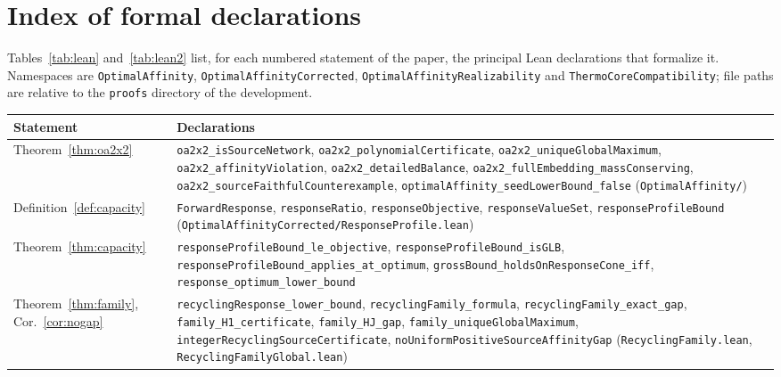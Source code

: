\documentclass[11pt,reqno]{amsart}
\theoremstyle{plain}
\theoremstyle{definition}
\theoremstyle{remark}
\numberwithin{equation}{section}
\begin{document}
\appendix
\section{Index of formal declarations}\label{app:lean}

Tables~\ref{tab:lean} and~\ref{tab:lean2} list, for each numbered statement of the paper, the principal Lean declarations that formalize it.  Namespaces are \texttt{OptimalAffinity}, \texttt{OptimalAffinityCorrected}, \texttt{OptimalAffinity\allowbreak Realizability} and \texttt{ThermoCore\allowbreak Compatibility}; file paths are relative to the \texttt{proofs} directory of the development.

\begin{table}[H]
\centering\small
\begin{tabular}{@{}>{\raggedright\arraybackslash}p{}>{\raggedright\arraybackslash}p{}@{}}
\toprule
Statement & Declarations \\
\midrule
Theorem~\ref{thm:oa2x2} & \texttt{oa2x2\_\allowbreak isSourceNetwork}, \texttt{oa2x2\_\allowbreak polynomialCertificate}, \texttt{oa2x2\_\allowbreak uniqueGlobalMaximum}, \texttt{oa2x2\_\allowbreak affinityViolation}, \texttt{oa2x2\_\allowbreak detailedBalance}, \texttt{oa2x2\_\allowbreak fullEmbedding\_\allowbreak massConserving}, \texttt{oa2x2\_\allowbreak sourceFaithfulCounterexample}, \texttt{optimalAffinity\_\allowbreak seedLowerBound\_\allowbreak false} (\texttt{OptimalAffinity/}) \\
Definition~\ref{def:capacity} & \texttt{ForwardResponse}, \texttt{responseRatio}, \texttt{responseObjective}, \texttt{responseValueSet}, \texttt{responseProfileBound} (\texttt{OptimalAffinityCorrected/ResponseProfile.lean}) \\
Theorem~\ref{thm:capacity} & \texttt{responseProfileBound\_\allowbreak le\_\allowbreak objective}, \texttt{responseProfileBound\_\allowbreak isGLB}, \texttt{responseProfileBound\_\allowbreak applies\_\allowbreak at\_\allowbreak optimum}, \texttt{grossBound\_\allowbreak holdsOnResponseCone\_\allowbreak iff}, \texttt{response\_\allowbreak optimum\_\allowbreak lower\_\allowbreak bound} \\
Theorem~\ref{thm:family}, Cor.~\ref{cor:nogap} & \texttt{recyclingResponse\_\allowbreak lower\_\allowbreak bound}, \texttt{recyclingFamily\_\allowbreak formula}, \texttt{recyclingFamily\_\allowbreak exact\_\allowbreak gap}, \texttt{family\_\allowbreak H1\_\allowbreak certificate}, \texttt{family\_\allowbreak HJ\_\allowbreak gap}, \texttt{family\_\allowbreak uniqueGlobalMaximum}, \texttt{integerRecyclingSourceCertificate}, \texttt{noUniformPositiveSourceAffinityGap} (\texttt{RecyclingFamily.lean}, \texttt{RecyclingFamilyGlobal.lean}) \\

\end{tabular}
\end{table}
\end{document}
